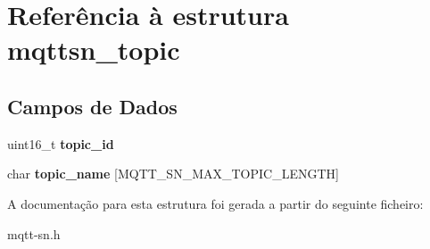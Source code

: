 \hypertarget{structmqttsn__topic}{\section{Referência à estrutura mqttsn\+\_\+topic}
\label{structmqttsn__topic}
}
\subsection*{Campos de Dados}
\begin{DoxyCompactItemize}
\item 
\hypertarget{structmqttsn__topic_ad562f54acc5597130e0710c356963dff}{uint16\+\_\+t {\bfseries topic\+\_\+id}}\label{structmqttsn__topic_ad562f54acc5597130e0710c356963dff}

\item 
\hypertarget{structmqttsn__topic_a3682faf73e58b07c78516bab6be65755}{char {\bfseries topic\+\_\+name} \mbox{[}M\+Q\+T\+T\+\_\+\+S\+N\+\_\+\+M\+A\+X\+\_\+\+T\+O\+P\+I\+C\+\_\+\+L\+E\+N\+G\+T\+H\mbox{]}}\label{structmqttsn__topic_a3682faf73e58b07c78516bab6be65755}

\end{DoxyCompactItemize}


A documentação para esta estrutura foi gerada a partir do seguinte ficheiro\+:\begin{DoxyCompactItemize}
\item 
mqtt-\/sn.\+h\end{DoxyCompactItemize}

